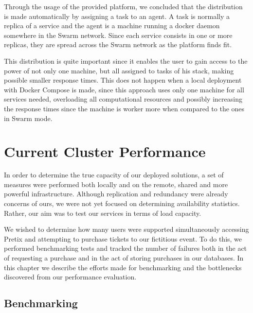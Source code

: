 \documentclass[12pt]{article}
\begin{document}
Through the usage of the provided platform, we concluded that the distribution is made automatically by assigning a task to an agent. A task is normally a replica of a service and the agent is a machine running a docker daemon somewhere in the Swarm network. Since each service consists in one or more replicas, they are spread across the Swarm network as the platform finds fit.

This distribution is quite important since it enables the user to gain access to the power of not only one machine, but all assigned to tasks of his stack, making possible smaller response times. This does not happen when a local deployment with Docker Compose is made, since this approach uses only one machine for all services needed, overloading all computational resources and possibly increasing the response times since the machine is worker more when compared to the ones in Swarm mode.


\section{Current Cluster Performance} \label{performance} %


In order to determine the true capacity of our deployed solutions, a set of measures were performed both locally and on the remote, shared and more powerful 
infrastructure.
Although replication and redundancy were already concerns of ours, we were not yet focused on determining availability statistics.
Rather, our aim was to test our services in terms of load capacity.

We wished to determine how many users were supported simultaneously accessing Pretix and attempting to purchase tickets to our fictitious event.
To do this, we performed benchmarking tests and tracked the number of failures both in the act of requesting a purchase and in the act of storing purchases in 
our databases.
In this chapter we describe the efforts made for benchmarking and the bottlenecks discovered from our performance evaluation.

\subsection{Benchmarking} \label{performance.benchmarking} %

\end{document}
